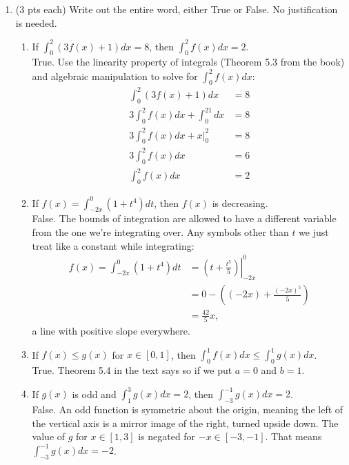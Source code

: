 \documentclass[11pt,letterpaper]{article}
\begin{document}
\begin{enumerate}
\begin{enumerate}
\item (3 pts each) Write out the entire word, either True or False.  No justification is needed.
\begin{enumerate}
\item If $\int_0^2(3f(x)+1)dx=8$, then $\int_0^2f(x)dx=2$. \\
\vspace{0.5pc}
True.  Use the linearity property of integrals (Theorem 5.3 from the book) and algebraic manipulation to solve for $\int_0^2f(x)dx$:
\begin{align*}
\int_0^2(3f(x)+1)dx &= 8 \\
3\int_0^2f(x)dx+\int_0^21dx &=8 \\
3\int_0^2f(x)dx+\left.x\right|_0^2 &=8 \\
3\int_0^2f(x)dx &=6 \\
\int_0^2f(x)dx &=2
\end{align*}
\item If $f(x)=\int_{-2x}^0(1+t^4)dt$, then $f(x)$ is decreasing. \\  
\vspace{0.5pc}
False.  The bounds of integration are allowed to have a different variable from the one we're integrating over.  Any symbols other than $t$ we just treat like a constant while integrating:
\begin{align*}
f(x)=\int_{-2x}^0(1+t^4)dt &=\left.\left(t+\frac{t^5}{5}\right)\right|_{-2x}^0 \\
&= 0-\left((-2x)+\frac{(-2x)^5}{5}\right) \\
&= \frac{42}{5}x,
\end{align*}
a line with positive slope everywhere.

\item If $f(x)\leq g(x)$ for $x\in[0,1]$, then $\int_0^1f(x)dx\leq\int_0^1g(x)dx$. \\
\vspace{0.5pc}
True.  Theorem 5.4 in the text says so if we put $a=0$ and $b=1$.

\item If $g(x)$ is odd and $\int_1^3g(x)dx=2$, then $\int_{-3}^{-1}g(x)dx=2$. \\
\vspace{0.5pc}
False.  An odd function is symmetric about the origin, meaning the left of the vertical axis is a mirror image of the right, turned upside down.  The value of $g$ for $x\in[1,3]$ is negated for $-x\in[-3,-1]$.  That means $\int_{-3}^{-1}g(x)dx=-2$.   


\end{enumerate}
\end{enumerate}
\end{enumerate}
\end{document}
